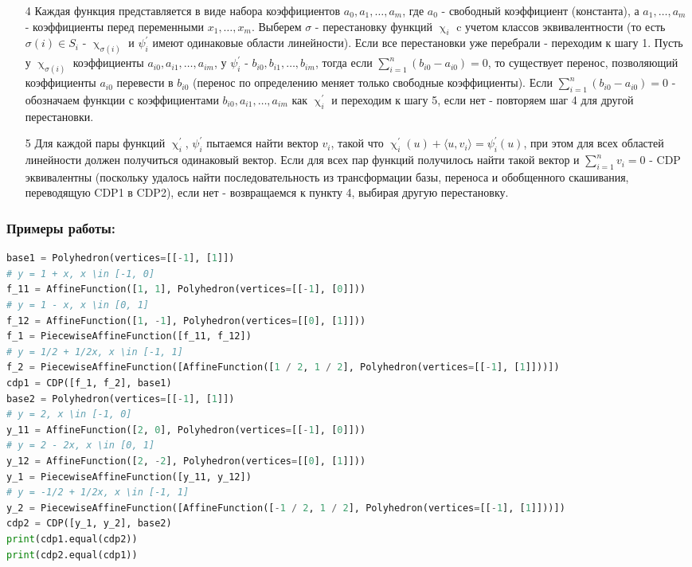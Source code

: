 \documentclass[fontsize=14pt]{scrartcl}
\theoremstyle{definition}
\begin{document}
\begin{itemize}
\item[4] Каждая функция представляется в виде набора коэффициентов $a_0, a_1, \dots, a_m$, где $a_0$ - свободный коэффициент (константа), а $a_1, \dots, a_m$ - коэффициенты перед переменными $x_1, \dots, x_m$. 
Выберем $\sigma$ - перестановку функций $\upchi_i$ c учетом классов эквивалентности (то есть $\sigma(i) \in S_i$ - $\upchi_{\sigma(i)}$ и $\psi^{'}_i$ имеют одинаковые области линейности). Если все перестановки уже перебрали - переходим к шагу 1. Пусть у $\upchi_{\sigma(i)}$ коэффициенты $a_{i0}, a_{i1}, \dots, a_{im}$, у $\psi^{'}_i$ - $b_{i0}, b_{i1}, \dots, b_{im}$, тогда если $\sum_{i=1}^{n}(b_{i0} - a_{i0}) = 0$, то существует перенос, позволяющий коэффициенты $a_{i0}$ перевести в $b_{i0}$ (перенос по определению меняет только свободные коэффициенты). Если $\sum_{i=1}^{n}(b_{i0} - a_{i0}) = 0$ - обозначаем функции с коэффициентами $b_{i0}, a_{i1}, \dots, a_{im}$ как $\upchi^{'}_i$ и переходим к шагу 5, если нет - повторяем шаг 4 для другой перестановки. 

\item[5] Для каждой пары функций $\upchi^{'}_i$, $\psi^{'}_i$ пытаемся найти вектор $v_i$, такой что $\upchi^{'}_i(u) + \langle u, v_i \rangle = \psi^{'}_i(u)$, при этом для всех областей линейности должен получиться одинаковый вектор. Если для всех пар функций получилось найти такой вектор и $\sum_{i=1}^n v_i = 0$ - CDP эквивалентны (поскольку удалось найти последовательность из трансформации базы, переноса и обобщенного скашивания, переводящую CDP1 в CDP2), если нет - возвращаемся к пункту 4, выбирая другую перестановку.
\end{itemize}

\subsubsection{Примеры работы:}


\begin{lstlisting}[language=Python,style=python]
base1 = Polyhedron(vertices=[[-1], [1]])
# y = 1 + x, x \in [-1, 0]
f_11 = AffineFunction([1, 1], Polyhedron(vertices=[[-1], [0]]))
# y = 1 - x, x \in [0, 1]
f_12 = AffineFunction([1, -1], Polyhedron(vertices=[[0], [1]]))
f_1 = PiecewiseAffineFunction([f_11, f_12])
# y = 1/2 + 1/2x, x \in [-1, 1]
f_2 = PiecewiseAffineFunction([AffineFunction([1 / 2, 1 / 2], Polyhedron(vertices=[[-1], [1]]))])
cdp1 = CDP([f_1, f_2], base1)
base2 = Polyhedron(vertices=[[-1], [1]])
# y = 2, x \in [-1, 0]
y_11 = AffineFunction([2, 0], Polyhedron(vertices=[[-1], [0]]))
# y = 2 - 2x, x \in [0, 1]
y_12 = AffineFunction([2, -2], Polyhedron(vertices=[[0], [1]]))
y_1 = PiecewiseAffineFunction([y_11, y_12])
# y = -1/2 + 1/2x, x \in [-1, 1]
y_2 = PiecewiseAffineFunction([AffineFunction([-1 / 2, 1 / 2], Polyhedron(vertices=[[-1], [1]]))])
cdp2 = CDP([y_1, y_2], base2)
print(cdp1.equal(cdp2))
print(cdp2.equal(cdp1))
\end{lstlisting}
\end{document}
